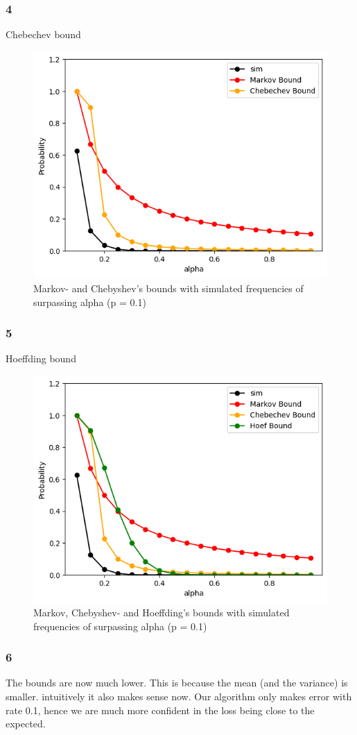\documentclass[a4paper,12pt]{article}
\begin{document}
\subsubsection*{4}
Chebechev bound
\begin{figure}[htbp]
    \centering
    \includegraphics[width=0.5\linewidth]{HA2_2a_23.png}
    \caption{Markov- and Chebyshev’s bounds with simulated frequencies of surpassing alpha (p = 0.1)} %
    \label{fig:p01}
\end{figure}

\subsubsection*{5}
Hoeffding bound
\begin{figure}[htbp]
    \centering
    \includegraphics[width=0.5\linewidth]{HA2_2a_24.png}
    \caption{Markov, Chebyshev- and Hoeffding's bounds with simulated frequencies of surpassing alpha (p = 0.1)} %
    \label{fig:p01}
\end{figure}


\subsubsection*{6}
The bounds are now much lower. This is because the mean (and the variance) is smaller.
intuitively it also makes sense now. Our algorithm only makes error with rate 0.1, hence we are much more confident in the loss being close to the expected.
\end{document}
